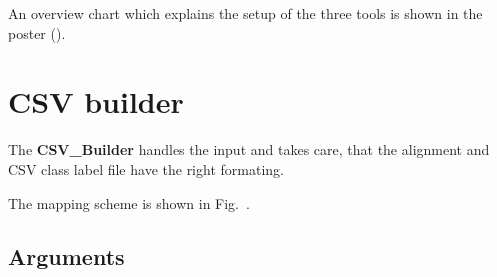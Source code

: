 \documentclass[a4paper,10pt]{article}
\begin{document}
An overview chart which explains the setup of the three tools is shown in
the poster ().

\section{CSV builder} \label{csv_b}

The \textbf{CSV\_Builder} handles the input and takes care, 
that the alignment and CSV class label file have the right formating.

The mapping scheme is shown in Fig.~.

\subsection{Arguments}
\end{document}
